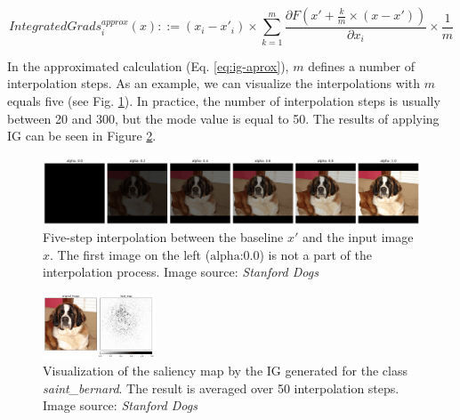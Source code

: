 \begin{equation}
    IntegratedGrads^{approx}_{i}(x)::=(x_{i}-x'_{i})\times\sum_{k=1}^{m}\frac{\partial F(x' + \frac{k}{m}\times(x - x'))}{\partial x_{i} } \times \frac{1}{m}
    \label{eq:ig-aprox}
\end{equation}

In the approximated calculation (Eq. \ref{eq:ig-aprox}), $m$ defines a number of interpolation steps. As an example, we can visualize the interpolations with $m$ equals five (see Fig. \ref{fig:ig-interpolation}). In practice, the number of interpolation steps is usually between 20 and 300, but the mode value is equal to 50. The results of applying IG can be seen in Figure \ref{fig:ig-saliency-map-bernard}.

\begin{figure}[ht]
    \centering
    \includegraphics[width=\textwidth]{methods/images/ig-saint_bernard-interpolation.png}
 \caption{Five-step interpolation between the baseline $x'$ and the input image $x$. The first image on the left ($\text{alpha:} 0.0$) is not a part of the interpolation process. Image source: \textit{Stanford Dogs} \cite{stanford-dogs} }\label{fig:ig-interpolation}
\end{figure}

\begin{figure}
  \includegraphics[width=0.30\textwidth]{methods/images/ig-saint_bernard.png}
  \caption{Visualization of the saliency map by the IG generated for the class \textit{saint\_bernard}. The result is averaged over 50 interpolation steps. Image source: \textit{Stanford Dogs} \cite{stanford-dogs}}\label{fig:ig-saliency-map-bernard}
\end{figure}

